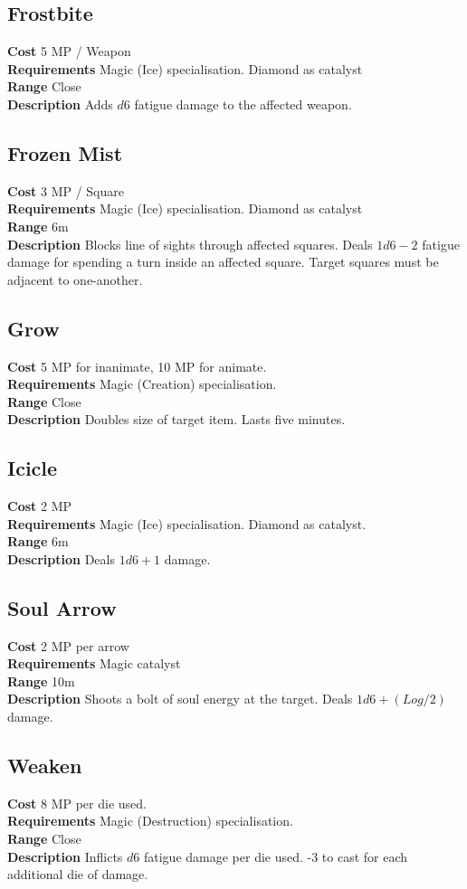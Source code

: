 \subsection*{Frostbite}
\textbf{Cost} 5 MP / Weapon\\
\textbf{Requirements} Magic (Ice) specialisation.
Diamond as catalyst\\
\textbf{Range} Close\\
\textbf{Description} Adds $d6$ fatigue damage to the affected weapon.

\subsection*{Frozen Mist} 
\textbf{Cost} 3 MP / Square\\
\textbf{Requirements} Magic (Ice) specialisation. 
Diamond as catalyst\\
\textbf{Range} 6m\\
\textbf{Description} Blocks line of sights through affected squares. 
Deals $1d6-2$ fatigue damage for spending a turn inside an affected square.
Target squares must be adjacent to one-another.

\subsection*{Grow}
\textbf{Cost} 5 MP for inanimate, 10 MP for animate.\\
\textbf{Requirements} Magic (Creation) specialisation. \\
\textbf{Range} Close\\
\textbf{Description} Doubles size of target item. 
Lasts five minutes.

\subsection*{Icicle}
\textbf{Cost} 2 MP\\
\textbf{Requirements} Magic (Ice) specialisation. 
Diamond as catalyst.\\
\textbf{Range} 6m\\
\textbf{Description} Deals $1d6+1$ damage.

\subsection*{Soul Arrow}
\textbf{Cost} 2 MP per arrow\\
\textbf{Requirements} Magic catalyst\\
\textbf{Range} 10m\\
\textbf{Description} Shoots a bolt of soul energy at the target.
Deals $1d6 + (Log / 2)$ damage.

\subsection*{Weaken}
\textbf{Cost} 8 MP per die used.\\
\textbf{Requirements} Magic (Destruction) specialisation.\\
\textbf{Range} Close\\
\textbf{Description} Inflicts $d6$ fatigue damage per die used. 
-3 to cast for each additional die of damage.
